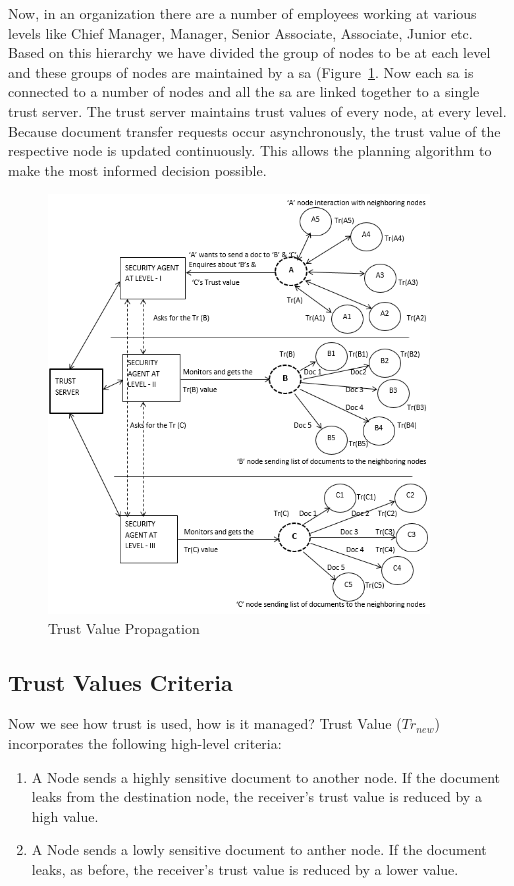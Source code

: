 Now, in an organization there are a number of employees working at various levels like
Chief Manager, Manager, Senior Associate, Associate, Junior etc. Based on this hierarchy we
have divided the group of nodes to be at each level and these groups of nodes are maintained
by a \gls{sa} (Figure~\ref{fig:TrustTransmission}. Now each \gls{sa} is connected to a number of nodes and all
the \Gls{sa} are linked together to a single trust server. The trust server
maintains trust values of every node, at every level. Because document transfer
requests occur asynchronously, the trust value of the respective node is updated
continuously. This allows the planning algorithm to
make the most informed decision possible. 



\begin{figure}[h!]
    \begin{center}
        \includegraphics[width=0.90\textwidth]{Figures/Trust_Propagation_Diagram.PNG}
        \caption{Trust Value Propagation}
        \label{fig:TrustTransmission}
    \end{center}
\end{figure}
\FloatBarrier

\subsection{Trust Values Criteria}
\label{sec:trust_value_criteria}
Now we see how trust is used, how is it managed?
Trust Value (\(Tr_{new}\)) incorporates the following high-level
criteria:
\begin{enumerate}
    \item A Node sends a highly sensitive document to another node. If the document leaks from
        the destination node, the receiver's trust value is reduced by a high value.
    \item A Node sends a lowly sensitive document to anther node. If the document leaks, as
        before, the receiver's trust value is reduced by a lower value.
\end{enumerate}

